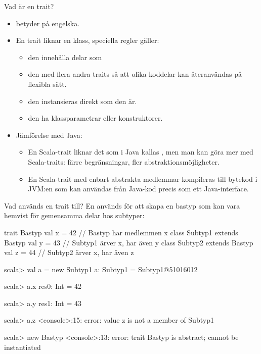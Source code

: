 \begin{Slide}{Vad är en trait?}
\begin{itemize}
\item {} betyder  på engelska.

\item En trait liknar en klass,  speciella regler gäller:

\begin{itemize}

\item den  innehålla delar som 

\item den  med flera andra traits så att olika koddelar kan återanvändas på flexibla sätt.

\item den  instansieras direkt som den är.

\item den  ha klassparametrar eller konstruktorer.
\end{itemize}

\pause
\item {\SlideFontSmall Jämförelse med Java:}
\begin{itemize}\SlideFontTiny
\item En Scala-trait liknar det som i Java kallas , men man kan göra mer med Scala-traits: färre begränsningar, fler abstraktionsmöjligheter.

\item En Scala-trait med enbart abstrakta medlemmar kompileras till bytekod i JVM:en som kan användas från Java-kod precis som ett Java-interface.
\end{itemize}
\end{itemize}

\end{Slide}

\begin{Slide}{Vad används en trait till?}
En  används för att skapa en bastyp som kan vara hemvist för gemensamma delar hos subtyper:
\begin{Code}
trait Bastyp { val x = 42 }                 // Bastyp har medlemmen x
class Subtyp1 extends Bastyp { val y = 43 } // Subtyp1 ärver x, har även y
class Subtyp2 extends Bastyp { val z = 44 } // Subtyp2 ärver x, har även z
\end{Code}
\pause\vspace{-0.5em}
\begin{REPL}
scala> val a = new Subtyp1
a: Subtyp1 = Subtyp1@51016012

scala> a.x
res0: Int = 42

scala> a.y
res1: Int = 43

scala> a.z
<console>:15: error: value z is not a member of Subtyp1

scala> new Bastyp
<console>:13: error: trait Bastyp is abstract; cannot be instantiated
\end{REPL}

\end{Slide}


